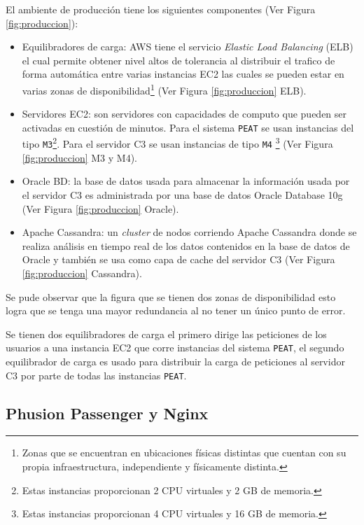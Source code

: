 
El ambiente de producción tiene los siguientes componentes (Ver Figura \ref{fig:produccion}):
\begin{itemize}
\item Equilibradores de carga: AWS tiene el servicio \textit{Elastic Load Balancing}
  (ELB) el cual permite obtener nivel altos de tolerancia al distribuir el trafico
  de forma automática entre varias instancias EC2 las cuales se pueden estar en
  varias zonas de disponibilidad\footnote{Zonas que se encuentran en
    ubicaciones físicas distintas que cuentan con su propia infraestructura,
    independiente y físicamente distinta.} (Ver Figura \ref{fig:produccion} ELB).
\item Servidores EC2: son servidores con capacidades de computo que pueden ser
  activadas en cuestión de minutos. Para el sistema \texttt{PEAT} se usan instancias
  del tipo \texttt{M3}\footnote{Estas instancias proporcionan 2 CPU virtuales y
    2 GB de memoria.}. Para el servidor C3 se usan instancias de tipo \texttt{M4}
  \footnote{Estas instancias proporcionan 4 CPU virtuales y 16 GB de memoria.}
  (Ver Figura \ref{fig:produccion} M3 y M4).
\item Oracle BD: la base de datos usada para almacenar la información usada
  por el servidor C3 es administrada por una base de datos Oracle Database 10g
  (Ver Figura \ref{fig:produccion} Oracle).
\item Apache Cassandra: un \textit{cluster} de nodos corriendo Apache Cassandra
  donde se realiza análisis en tiempo real de los datos contenidos en la
  base de datos de Oracle y también se usa como capa de cache del servidor C3
  (Ver Figura \ref{fig:produccion} Cassandra).
\end{itemize}

Se pude observar que la figura que se tienen dos zonas de disponibilidad esto logra
que se tenga una mayor redundancia al no tener un único punto de error.

Se tienen dos equilibradores de carga el primero dirige las peticiones de los
usuarios a una instancia EC2 que corre instancias del sistema \texttt{PEAT},
el segundo equilibrador de carga es usado para distribuir la carga de peticiones
al servidor C3 por parte de todas las instancias \texttt{PEAT}.

\subsection{Phusion Passenger y Nginx}

